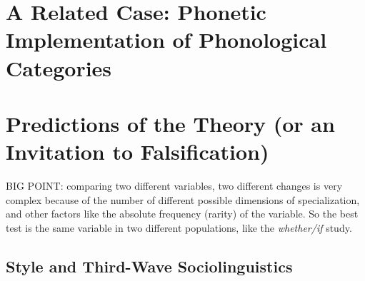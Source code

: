 %
%
%
%
%
%
%

\section{A Related Case: Phonetic Implementation of Phonological Categories}


\section{Predictions of the Theory (or an Invitation to Falsification)}
BIG POINT: comparing two different variables, two different changes is very complex because of the number of different possible dimensions of specialization, and other factors like the absolute frequency (rarity) of the variable.
So the best test is the same variable in two different populations, like the \textsl{whether/if} study.

\subsection{Style and Third-Wave Sociolinguistics}



